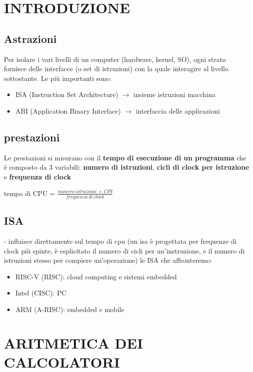 \documentclass[12pt, a4paper]{article}
\begin{document}
\section{INTRODUZIONE}
\subsection{Astrazioni}
Per isolare i vari livelli di un computer (hardware, kernel, SO), ogni strato fornisce delle interfacce (o set di istruzioni) con la quale interagire al livello sottostante.
Le più importanti sono:
\begin{itemize}
    \item ISA (Instruction Set Architecture) $\rightarrow$ insieme istruzioni macchina
    \item ABI (Application Binary Interface) $\rightarrow$ interfaccia delle applicazioni
\end{itemize}

\subsection{prestazioni}
Le prestazioni si misurano con il \textbf{tempo di esecuzione di un programma} che è composto da 3 variabili:
\textbf{numero di istruzioni}, \textbf{cicli di clock per istruzione} e \textbf{frequenza di clock}
\begin{center}
    tempo di CPU = $\frac{numero\ istruzioni\ \times \ CPI}{frequenza\ di\ clock}$
\end{center}

\subsection{ISA}
 - influisce direttamente sul tempo di cpu (un isa è progettata per frequenze di clock più spinte, è esplicitato il numero di cicli per un'instruzione, e il numero di istruzioni stesso per compiere un'operazione)
 le ISA che affronteremo:
 \begin{itemize}
    \item RISC-V (RISC): cloud computing e sistemi embedded
    \item Intel (CISC): PC
    \item ARM (A-RISC): embedded e mobile
 \end{itemize}


\section{ARITMETICA DEI CALCOLATORI}
\end{document}
